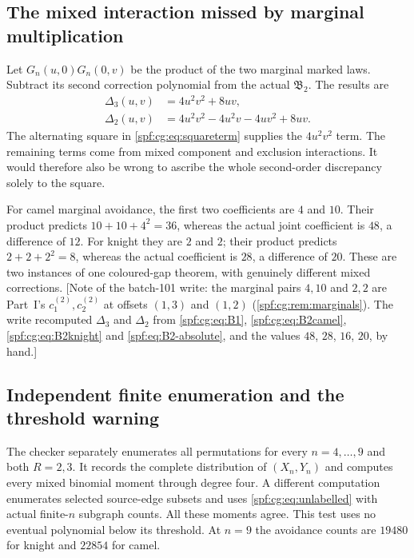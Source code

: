 \documentclass[11pt]{article}
\numberwithin{equation}{section}
\theoremstyle{definition}
\theoremstyle{remark}
\theoremstyle{definition}
\begin{document}
\subsection{The mixed interaction missed by marginal multiplication}
\label{spf:cg:sec:interaction}
Let $G_n(u,0)G_n(0,v)$ be the product of the two marginal marked laws.
Subtract its second correction polynomial from the actual $\mathfrak B_2$.
The results are
\begin{equation}
 \begin{split}
 \Delta_3(u,v)&=4u^2v^2+8uv,\\
 \Delta_2(u,v)&=4u^2v^2-4u^2v-4uv^2+8uv.
 \end{split}
 \label{spf:cg:eq:interaction}
\end{equation}
The alternating square in \eqref{spf:cg:eq:squareterm} supplies the
$4u^2v^2$ term. The remaining terms come from mixed component and exclusion
interactions. It would therefore also be wrong to ascribe the whole
second-order discrepancy solely to the square.

For camel marginal avoidance, the first two coefficients are $4$ and $10$.
Their product predicts $10+10+4^2=36$, whereas the actual joint coefficient
is $48$, a difference of $12$. For knight they are $2$ and $2$; their
product predicts $2+2+2^2=8$, whereas the actual coefficient is $28$, a
difference of $20$. These are two instances of one coloured-gap theorem,
with genuinely different mixed corrections. [Note of the batch-101 write:
the marginal pairs $4,10$ and $2,2$ are Part~I's $c^{(2)}_1,c^{(2)}_2$ at
offsets $(1,3)$ and $(1,2)$ (\cref{spf:cg:rem:marginals}). The write
recomputed $\Delta_3$ and $\Delta_2$ from \eqref{spf:cg:eq:B1},
\eqref{spf:cg:eq:B2camel}, \eqref{spf:cg:eq:B2knight} and
\eqref{spf:eq:B2-absolute}, and the values $48$, $28$, $16$, $20$, by hand.]

\subsection{Independent finite enumeration and the threshold warning}
The checker separately enumerates all permutations for every $n=4,\ldots,9$
and both $R=2,3$. It records the complete distribution of $(X_n,Y_n)$ and
computes every mixed binomial moment through degree four. A different
computation enumerates selected source-edge subsets and uses
\eqref{spf:cg:eq:unlabelled} with actual finite-$n$ subgraph counts. All
these moments agree. This test uses no eventual polynomial below its
threshold. At $n=9$ the avoidance counts are $19480$ for knight and $22854$
for camel.
\end{document}
